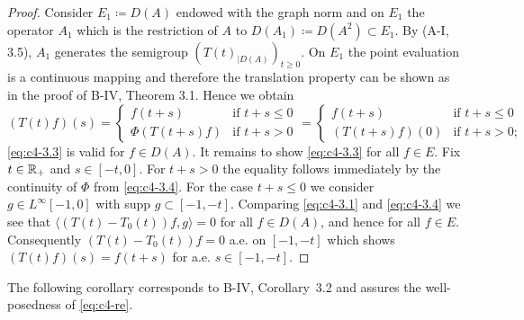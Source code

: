 \begin{proof}
Consider $E_1 \coloneqq D(A)$ endowed with the graph norm 
and on $E_1$ the operator $A_1$ which is the restriction of $A$ to $D(A_1) \coloneqq D(A^{2})\subset E_1$.
By (A-I, 3.5), $A_1$ generates the semigroup $(T(t)_{|D(A)})_{t \geq 0}$.
On $E_1$ the point evaluation is a continuous mapping and therefore the translation property can be shown as in the proof of B-IV, Theorem 3.1.
Hence we obtain
\begin{equation}\label{eq:c4-3.4}
(T(t)f)(s)= \begin{cases}
    f(t+s) &\text{if } t+s \leq 0 \\
    \Phi(T(t+s)f) &\text{if } t+s > 0
\end{cases} = \begin{cases}
    f(t+s) &\text{if } t+s \leq 0 \\
    (T(t+s)f)(0) &\text{if } t+s > 0;
\end{cases}
\end{equation}
\ie \eqref{eq:c4-3.3} is valid for $f \in D(A)$.
It remains to show \eqref{eq:c4-3.3} for all $f \in E$.
Fix $t \in \mathbb{R}_+$ and $s \in [-t,0]$.
For $t + s > 0$ the equality follows immediately by the continuity of $\Phi$ from \eqref{eq:c4-3.4}.
For the case $t + s \leq 0$ we consider $g \in L^{\infty}[-1,0]$ with supp $g \subset [-1,-t]$.
Comparing \eqref{eq:c4-3.1} and \eqref{eq:c4-3.4} we see that $\langle(T(t)-T_0(t))f,g\rangle = 0$ for all $f \in D(A)$, and hence for all $f \in E$.
Consequently $(T(t)-T_{0}(t))f = 0$ a.e. on $[-1,-t]$ which shows $(T(t)f)(s) = f(t+s)$ for a.e. $s \in [-1,-t]$.
\end{proof}
The following corollary corresponds to B-IV, Corollary~3.2 and assures the well-posed\-ness of \eqref{eq:c4-re}.

